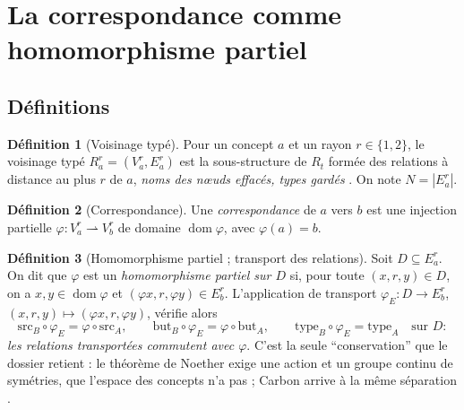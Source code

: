 \documentclass[11pt,a4paper]{article}
\theoremstyle{definition}
\newtheorem{definition}{Définition}[section]
\theoremstyle{plain}
\newcommand{\dom}{\operatorname{dom}}
\begin{document}
\section{La correspondance comme homomorphisme partiel}
\label{sec:correspondance}

\subsection{Définitions}

\begin{definition}[Voisinage typé]
Pour un concept $a$ et un rayon $r\in\{1,2\}$, le voisinage typé $R^r_a=(V^r_a,E^r_a)$ est la
sous-structure de $R_t$ formée des relations à distance au plus $r$ de $a$, \emph{noms des nœuds
effacés, types gardés} \cite[partie~2]{fable}. On note $N=|E^r_a|$.
\end{definition}

\begin{definition}[Correspondance]
Une \emph{correspondance} de $a$ vers $b$ est une injection partielle
$\varphi:V^r_a\rightharpoonup V^r_b$ de domaine $\dom\varphi$, avec $\varphi(a)=b$.
\end{definition}

\begin{definition}[Homomorphisme partiel ; transport des relations]
\label{def:homo}
Soit $D\subseteq E^r_a$. On dit que $\varphi$ est un \emph{homomorphisme partiel sur $D$} si, pour toute
$(x,r,y)\in D$, on a $x,y\in\dom\varphi$ et $(\varphi x,r,\varphi y)\in E^r_b$. L'application de
transport $\varphi_E:D\to E^r_b$, $(x,r,y)\mapsto(\varphi x,r,\varphi y)$, vérifie alors
\[ \mathrm{src}_B\circ\varphi_E=\varphi\circ\mathrm{src}_A,\qquad
   \mathrm{but}_B\circ\varphi_E=\varphi\circ\mathrm{but}_A,\qquad
   \mathrm{type}_B\circ\varphi_E=\mathrm{type}_A \quad\text{sur } D : \]
\emph{les relations transportées commutent avec $\varphi$}. C'est la seule \enquote{conservation}
que le dossier retient : le théorème de Noether exige une action et un groupe continu de
symétries, que l'espace des concepts n'a pas \cite[partie~2]{fable} ; Carbon arrive à la même
séparation \cite[section~3]{carbonhomo}.
\end{definition}
\end{document}
